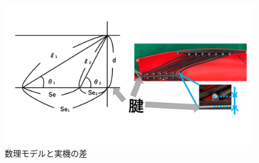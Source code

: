 \begin{figure}[ht]
    \centering
    \includegraphics[scale=0.4]{image/model_jikki_defference.png}
    \caption{数理モデルと実機の差}
    \label{fig:defference_model_jikki}
\end{figure}